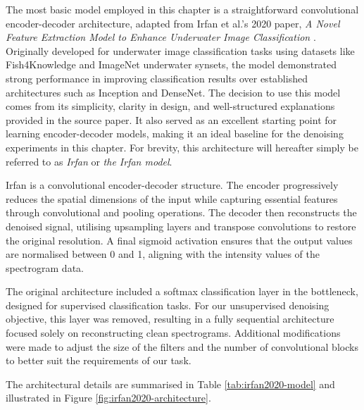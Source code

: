 The most basic model employed in this chapter is a straightforward convolutional encoder-decoder architecture, adapted from Irfan et al.'s 2020 paper, \textit{A Novel Feature Extraction Model to Enhance Underwater Image Classification} \cite{brito-loeza_novel_2020}. Originally developed for underwater image classification tasks using datasets like Fish4Knowledge and ImageNet underwater synsets, the model demonstrated strong performance in improving classification results over established architectures such as Inception and DenseNet. The decision to use this model comes from its simplicity, clarity in design, and well-structured explanations provided in the source paper. It also served as an excellent starting point for learning encoder-decoder models, making it an ideal baseline for the denoising experiments in this chapter. For brevity, this architecture will hereafter simply be referred to as \textit{Irfan} or \textit{the Irfan model}.

Irfan is a convolutional encoder-decoder structure. The encoder progressively reduces the spatial dimensions of the input while capturing essential features through convolutional and pooling operations. The decoder then reconstructs the denoised signal, utilising upsampling layers and transpose convolutions to restore the original resolution. A final sigmoid activation ensures that the output values are normalised between 0 and 1, aligning with the intensity values of the spectrogram data.

The original architecture included a softmax classification layer in the bottleneck, designed for supervised classification tasks. For our unsupervised denoising objective, this layer was removed, resulting in a fully sequential architecture focused solely on reconstructing clean spectrograms. Additional modifications were made to adjust the size of the filters and the number of convolutional blocks to better suit the requirements of our task.

The architectural details are summarised in Table \ref{tab:irfan2020-model} and illustrated in Figure \ref{fig:irfan2020-architecture}.

